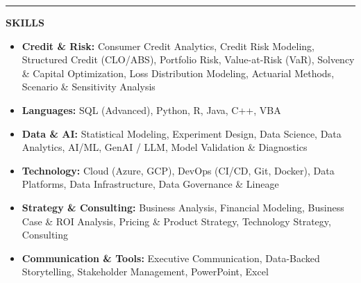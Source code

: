 \documentclass[8pt]{extarticle}
\newcommand{\Section}[1]{%
  \vspace{0.5\baselineskip}\hrule
  \vspace{0.12\baselineskip}%
  \begin{center}\textbf{\scshape #1}\end{center}}
\begin{document}
\Section{SKILLS}
\begin{itemize}
  \item \textbf{Credit \& Risk:} Consumer Credit Analytics, Credit Risk Modeling, Structured Credit (CLO/ABS), Portfolio Risk, Value-at-Risk (VaR), Solvency \& Capital Optimization, Loss Distribution Modeling, Actuarial Methods, Scenario \& Sensitivity Analysis
  \item \textbf{Languages:} SQL (Advanced), Python, R, Java, C++, VBA
  \item \textbf{Data \& AI:} Statistical Modeling, Experiment Design, Data Science, Data Analytics, AI/ML, GenAI / LLM, Model Validation \& Diagnostics
  \item \textbf{Technology:} Cloud (Azure, GCP), DevOps (CI/CD, Git, Docker), Data Platforms, Data Infrastructure, Data Governance \& Lineage
  \item \textbf{Strategy \& Consulting:} Business Analysis, Financial Modeling, Business Case \& ROI Analysis, Pricing \& Product Strategy, Technology Strategy, Consulting
  \item \textbf{Communication \& Tools:} Executive Communication, Data-Backed Storytelling, Stakeholder Management, PowerPoint, Excel
\end{itemize}
\end{document}
